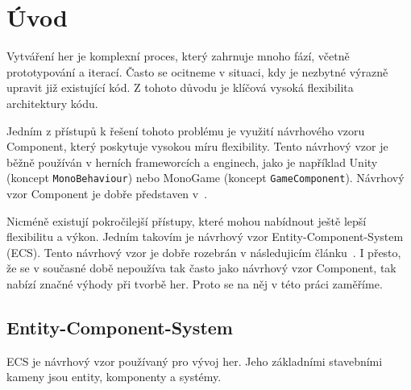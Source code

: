 \chapter{Úvod}

Vytváření her je komplexní proces, který zahrnuje mnoho fází, včetně prototypování a iterací. Často se ocitneme v situaci, kdy je nezbytné výrazně upravit již existující kód. Z tohoto důvodu je klíčová vysoká flexibilita architektury kódu.

Jedním z přístupů k řešení tohoto problému je využití návrhového vzoru Component, který poskytuje vysokou míru flexibility. Tento návrhový vzor je běžně používán v herních frameworcích a enginech, jako je například Unity (koncept \verb|MonoBehaviour|) nebo MonoGame (koncept \verb|GameComponent|). Návrhový vzor Component je dobře představen v~\citet{nystrom2014game}.

Nicméně existují pokročilejší přístupy, které mohou nabídnout ještě lepší flexibilitu a výkon. Jedním takovím je návrhový vzor Entity-Component-System (ECS). Tento návrhový vzor je dobře rozebrán v následujicím článku~\cite{Caini_2019}. I přesto, že se v současné době nepoužíva tak často jako návrhový vzor Component, tak nabízí značné výhody při tvorbě her. Proto se na něj v této práci zaměříme.

\section{Entity-Component-System}
ECS je návrhový vzor používaný pro vývoj her. Jeho základními stavebními kameny jsou entity, komponenty a systémy.

